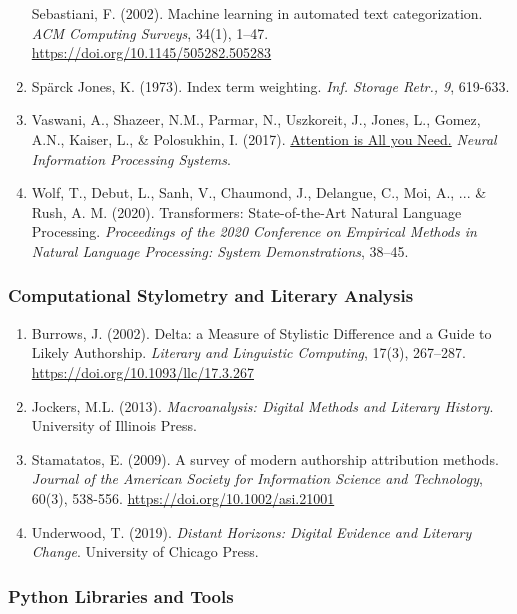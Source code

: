 \documentclass[
]{article}
\begin{document}
\begin{enumerate}
  Sebastiani, F. (2002). Machine learning in automated text
  categorization. \emph{ACM Computing Surveys}, 34(1), 1--47.
  \url{https://doi.org/10.1145/505282.505283}
\item
  Spärck Jones, K. (1973). Index term weighting. \emph{Inf. Storage
  Retr., 9}, 619-633.
\item
  Vaswani, A., Shazeer, N.M., Parmar, N., Uszkoreit, J., Jones, L.,
  Gomez, A.N., Kaiser, L., \& Polosukhin, I. (2017).
  \href{https://arxiv.org/abs/1706.03762}{Attention is All you Need.}
  \emph{Neural Information Processing Systems}.
\item
  Wolf, T., Debut, L., Sanh, V., Chaumond, J., Delangue, C., Moi, A.,
  ... \& Rush, A. M. (2020). Transformers: State-of-the-Art Natural
  Language Processing. \emph{Proceedings of the 2020 Conference on
  Empirical Methods in Natural Language Processing: System
  Demonstrations}, 38--45.
\end{enumerate}

\subsubsection{Computational Stylometry and Literary
Analysis}\label{computational-stylometry-and-literary-analysis}

\begin{enumerate}
\def\labelenumi{\arabic{enumi}.}
\item
  Burrows, J. (2002). \textquotesingle Delta\textquotesingle: a Measure
  of Stylistic Difference and a Guide to Likely Authorship.
  \emph{Literary and Linguistic Computing}, 17(3), 267--287.
  \url{https://doi.org/10.1093/llc/17.3.267}
\item
  Jockers, M.L. (2013). \emph{Macroanalysis: Digital Methods and
  Literary History}. University of Illinois Press.
\item
  Stamatatos, E. (2009). A survey of modern authorship attribution
  methods. \emph{Journal of the American Society for Information Science
  and Technology}, 60(3), 538-556.
  \url{https://doi.org/10.1002/asi.21001}
\item
  Underwood, T. (2019). \emph{Distant Horizons: Digital Evidence and
  Literary Change}. University of Chicago Press.
\end{enumerate}

\subsubsection{Python Libraries and
Tools}\label{python-libraries-and-tools}
\end{document}
